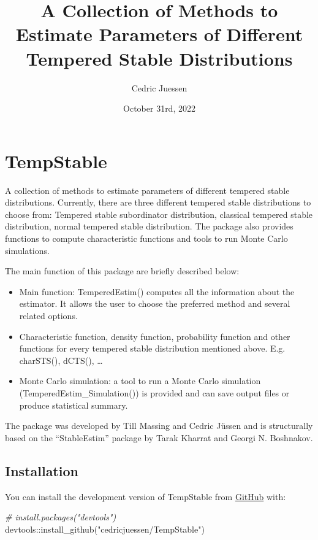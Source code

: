 \documentclass[
]{article}
\title{A Collection of Methods to Estimate Parameters of Different
Tempered Stable Distributions}
\author{Cedric Juessen}
\date{October 31rd, 2022}
\newenvironment{Shaded}{\begin{snugshade}}{\end{snugshade}}
\newcommand{\CommentTok}[1]{\textcolor[rgb]{0.56,0.35,0.01}{\textit{#1}}}
\newcommand{\FunctionTok}[1]{\textcolor[rgb]{0.00,0.00,0.00}{#1}}
\newcommand{\NormalTok}[1]{#1}
\newcommand{\SpecialCharTok}[1]{\textcolor[rgb]{0.00,0.00,0.00}{#1}}
\newcommand{\StringTok}[1]{\textcolor[rgb]{0.31,0.60,0.02}{#1}}
\providecommand{\tightlist}{%
  \setlength{\itemsep}{0pt}\setlength{\parskip}{0pt}}
\begin{document}
\maketitle

\hypertarget{tempstable}{%
\section{\texorpdfstring{TempStable }{TempStable }}\label{tempstable}}

A collection of methods to estimate parameters of different tempered
stable distributions. Currently, there are three different tempered
stable distributions to choose from: Tempered stable subordinator
distribution, classical tempered stable distribution, normal tempered
stable distribution. The package also provides functions to compute
characteristic functions and tools to run Monte Carlo simulations.

The main function of this package are briefly described below:

\begin{itemize}
\tightlist
\item
  Main function: TemperedEstim() computes all the information about the
  estimator. It allows the user to choose the preferred method and
  several related options.
\item
  Characteristic function, density function, probability function and
  other functions for every tempered stable distribution mentioned
  above. E.g. charSTS(), dCTS(), \ldots{}
\item
  Monte Carlo simulation: a tool to run a Monte Carlo simulation
  (TemperedEstim\_Simulation()) is provided and can save output files or
  produce statistical summary.
\end{itemize}

The package was developed by Till Massing and Cedric Jüssen and is
structurally based on the ``StableEstim'' package by Tarak Kharrat and
Georgi N. Boshnakov.

\hypertarget{installation}{%
\subsection{Installation}\label{installation}}

You can install the development version of TempStable from
\href{https://github.com/}{GitHub} with:

\begin{Shaded}
\begin{Highlighting}[]
\CommentTok{\# install.packages("devtools")}
\NormalTok{devtools}\SpecialCharTok{::}\FunctionTok{install\_github}\NormalTok{(}\StringTok{"cedricjuessen/TempStable"}\NormalTok{)}
\end{Highlighting}
\end{Shaded}
\end{document}

